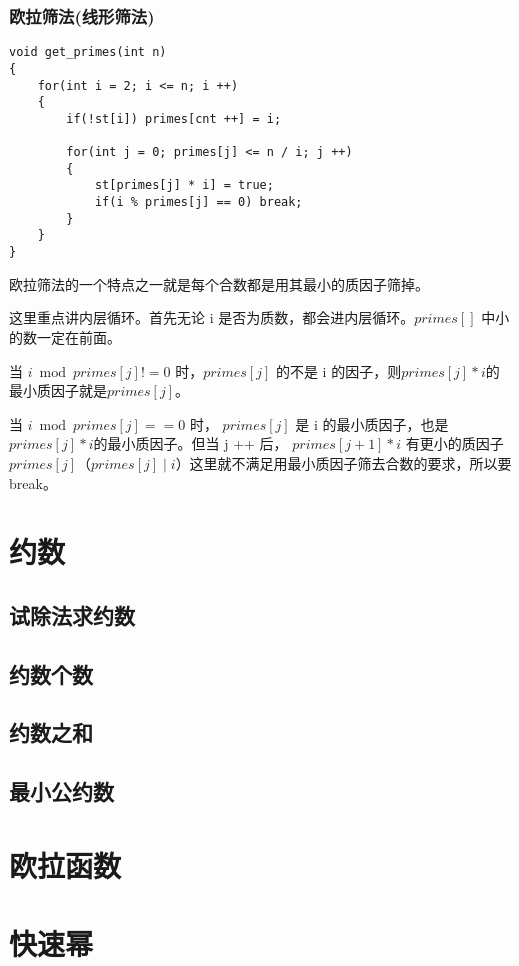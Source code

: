 \documentclass[]{book}
\begin{document}
\subsection{欧拉筛法(线形筛法)}
\begin{lstlisting}
void get_primes(int n)
{
    for(int i = 2; i <= n; i ++)
    {
        if(!st[i]) primes[cnt ++] = i;
        
        for(int j = 0; primes[j] <= n / i; j ++)
        {
            st[primes[j] * i] = true;
            if(i % primes[j] == 0) break;
        }
    }
}
\end{lstlisting}

欧拉筛法的一个特点之一就是每个合数都是用其最小的质因子筛掉。

这里重点讲内层循环。首先无论 i 是否为质数，都会进内层循环。$primes[]$ 中小的数一定在前面。

当 $i \bmod primes[j] != 0$ 时，$primes[j]$ 的不是 i 的因子，则$primes[j] * i$的最小质因子就是$primes[j]$。

当 $i \bmod primes[j] == 0$ 时， $primes[j]$ 是 i 的最小质因子，也是$primes[j] * i$的最小质因子。但当 j ++ 后，
$primes[j + 1] * i$ 有更小的质因子 $primes[j]$（$primes[j] \mid i$）这里就不满足用最小质因子筛去合数的要求，所以要break。

\chapter{约数}
\section{试除法求约数}

\section{约数个数}

\section{约数之和}

\section{最小公约数}

\chapter{欧拉函数}

\chapter{快速幂}
\end{document}
